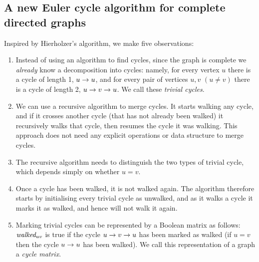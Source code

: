 \documentclass[preprint,times]{elsarticle}
\begin{document}
\subsection{A new Euler cycle algorithm for complete directed graphs}

\def\pair#1#2{\ifx #1#2
#1\rightarrow #2 %
\else #1\rightarrow#2\rightarrow#1\fi}

Inspired by Hierholzer's algorithm, we make five observations:

\begin{enumerate}\raggedright
\item
Instead of using an algorithm to find cycles, since the graph is complete we \emph{already\/} know a decomposition into cycles: namely, for every vertex $u$ there is a cycle of length 1, $\pair uu$, and for every pair of vertices $u,v$ $(u \neq v)$ there is a cycle of length 2, $\pair uv$.  We call these \emph{trivial cycles}.

\item
We can use a recursive algorithm to merge cycles. It starts walking any cycle, and if it crosses another cycle (that has not already been walked) it recursively walks that cycle, then resumes the cycle it was walking. This approach does not need any explicit operations or data structure to merge cycles.

\item
The recursive algorithm needs to distinguish the two types of trivial cycle, which depends simply on whether $u=v$.

\item
Once a cycle has been walked, it is not walked again. The algorithm therefore starts by initialising every trivial cycle as unwalked, and as it walks a cycle it marks it as walked, and hence will not walk it again.

\item
Marking trivial cycles can be represented by a Boolean matrix as follows: $\mbox{\it walked}_{uv}$ is true if the cycle $\pair uv$ has been marked as walked (if $u=v$ then the cycle $\pair uu$ has been walked). We call this representation of a graph a \emph{cycle matrix}. 
\end{enumerate}
\end{document}
